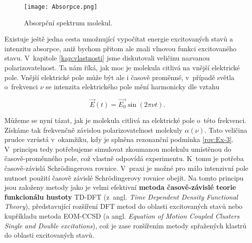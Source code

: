 \begin{figure} [htb]
\centering
\texttt{[image: Absorpce.png]}
\caption{Absorpční spektrum molekul.}
\label{obr:Absorpce}
\end{figure}

Existuje ještě jedna cesta umožnující vypočítat energie excitovaných stavů a intenzitu absorpce, aniž bychom přitom ale znali vlnovou funkci excitovaného stavu. V~kapitole \ref{kap:vlastnosti} jsme diskutovali veličinu nazvanou polarizovatelnost. Ta nám říká, jak moc je molekula citlivá na vnější elektrické pole. Vnější elektrické pole může být ale i časově proměnné, v~případě světla o~frekvenci $\nu$ se intenzita elektrického pole mění harmonicky dle vztahu

\begin{equation}
\vec{E}(t) = \vec{E_0} \sin (2 \pi \nu t).
\label{rov:Ex-6}
\end{equation}

Můžeme se nyní tázat, jak je molekula citlivá na elektrické pole o~této frekvenci. Získáme tak frekvenčně závislou polarizovatelnost molekuly $\alpha(\nu)$. Tato veličina prudce vzrůstá v~okamžiku, kdy je splněna rezonanční podmínka \eqref{rov:Ex-3}. V~principu tedy potřebujeme simulovat zkoumanou molekulu umístěnou do časově-proměnného pole, což vlastně odpovídá experimentu. K~tomu je potřeba časově-závislá Schr\"odingerova rovnice. V~praxi je možné pro málo intenzivní pole nutnost použití časově závislé Schr\"odingerovy rovnice obejít. Na tomto principu jsou založeny metody jako je velmi efektivní \textbf{metoda časově-závislé teorie funkcionálu hustoty} TD-DFT (z~angl. \textit{Time Dependent Density Functional Theory}), představující rozšíření DFT metod do oblasti excitovaných stavů nebo kupříkladu metoda EOM-CCSD (a angl. \textit{Equation of Motion Coupled Clusters Single and Double excitations}), což je zase rozšířením metody spřažených klastrů do oblasti excitovaných stavů. 
   

 

           
      

   




 




      

      



